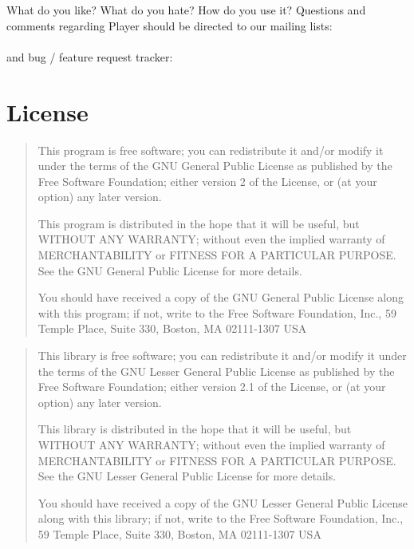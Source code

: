 \documentclass[11pt]{report}
\begin{document}
What do you like? What do you hate?  How do you use it?
Questions and comments regarding Player should be directed to
our mailing lists:\\
\\
and bug / feature request tracker:\\

\section{License}

\begin{quote}
 This program is free software; you can redistribute it and/or modify
 it under the terms of the GNU General Public License as published by
 the Free Software Foundation; either version 2 of the License, or
 (at your option) any later version.

 This program is distributed in the hope that it will be useful,
 but WITHOUT ANY WARRANTY; without even the implied warranty of
 MERCHANTABILITY or FITNESS FOR A PARTICULAR PURPOSE.  See the
 GNU General Public License for more details.

 You should have received a copy of the GNU General Public License
 along with this program; if not, write to the Free Software
 Foundation, Inc., 59 Temple Place, Suite 330, Boston, MA  02111-1307
 USA
\end{quote}


\begin{quote}
This library is free software; you can redistribute it and/or 
modify it under the terms of the GNU Lesser General Public
License as published by the Free Software Foundation; either
version 2.1 of the License, or (at your option) any later version.

This library is distributed in the hope that it will be useful,
but WITHOUT ANY WARRANTY; without even the implied warranty of
MERCHANTABILITY or FITNESS FOR A PARTICULAR PURPOSE.  See the GNU
Lesser General Public License for more details.

You should have received a copy of the GNU Lesser General Public
License along with this library; if not, write to the Free Software
Foundation, Inc., 59 Temple Place, Suite 330, Boston, MA  02111-1307
USA
\end{quote}
\end{document}
